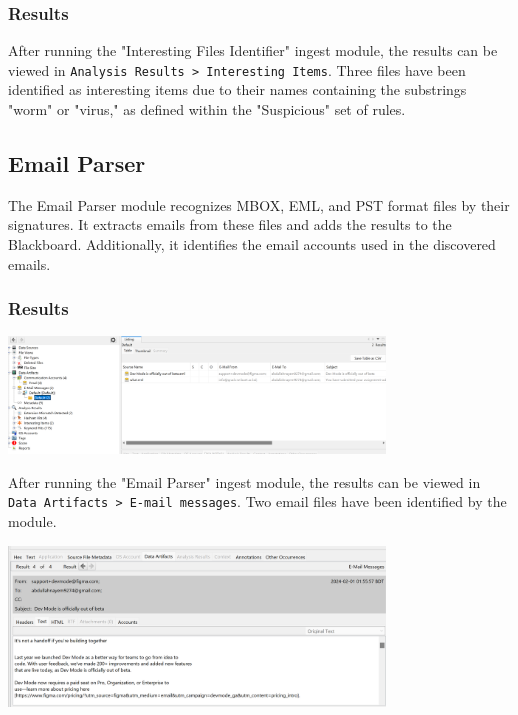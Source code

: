 \documentclass{extarticle}
\begin{document}
\subsubsection*{Results}
After running the "Interesting Files Identifier" ingest module, the results can be viewed in \texttt{Analysis Results > Interesting Items}. Three files have been identified as interesting items due to their names containing the substrings "worm" or "virus," as defined within the "Suspicious" set of rules.

\subsection{Email Parser}
The Email Parser module recognizes MBOX, EML, and PST format files by their signatures. It extracts emails from these files and adds the results to the Blackboard. Additionally, it identifies the email accounts used in the discovered emails.

\subsubsection*{Results}

\begin{center}
    \includegraphics[width=0.75\textwidth]{3/3.9/Results of Email Parser ingest module.png}
\end{center}

After running the "Email Parser" ingest module, the results can be viewed in \texttt{Data Artifacts > E-mail messages}. Two email files have been identified by the module.

\begin{center}
    \includegraphics[width=0.75\textwidth]{3/3.9/Details of an email text version.png}
\end{center}
\end{document}
